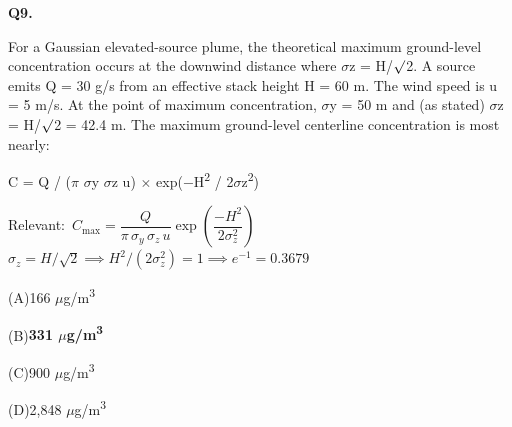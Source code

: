 \documentclass[11pt]{article}
\newcommand{\correct}[1]{\textbf{#1}\;{\color{accent}$\checkmark$}}
\newcommand{\optline}[2]{\par\noindent\hspace{1.2em}(#1)\hspace{0.6em}#2}
\begin{document}
\vspace{9pt}
\filbreak
\textbf{\color{accent}Q9.}\par\vspace{2pt}
For a Gaussian elevated-source plume, the theoretical maximum ground-level concentration occurs at the downwind distance where $\sigma$z = H/$\surd$2. A source emits Q = 30 g/s from an effective stack height H = 60 m. The wind speed is u = 5 m/s. At the point of maximum concentration, $\sigma$y = 50 m and (as stated) $\sigma$z = H/$\surd$2 = 42.4 m. The maximum ground-level centerline concentration is most nearly:

C = Q / ($\pi$ $\sigma$y $\sigma$z u) $\times$ exp($-$H\textsuperscript{2} / 2$\sigma$z\textsuperscript{2})\par\vspace{3pt}
{\small\color{soft}Relevant:}\ $C_{\max} = \dfrac{Q}{\pi\,\sigma_y\,\sigma_z\,u}\exp\!\left(\dfrac{-H^2}{2\sigma_z^2}\right)$ \quad $\sigma_z = H/\sqrt{2} \implies H^2/(2\sigma_z^2) = 1 \implies e^{-1} = 0.3679$\par\vspace{3pt}
\optline{A}{166 $\mu$g/m\textsuperscript{3}}
\optline{B}{\correct{331 $\mu$g/m\textsuperscript{3}}}
\optline{C}{900 $\mu$g/m\textsuperscript{3}}
\optline{D}{2,848 $\mu$g/m\textsuperscript{3}}
\par\vspace{3pt}
\end{document}
